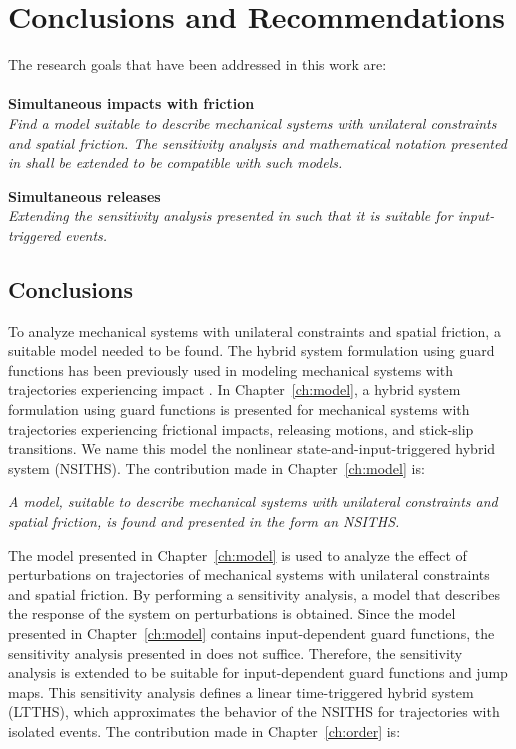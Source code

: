 \documentclass[../DC2017114Bouma.tex]{subfiles}
\begin{document}
\graphicspath{{05_Conclusions/img/}}
\renewcommand{\chaptermark}[1]{\markboth{\thechapter.\ #1}{}}
\renewcommand{\sectionmark}[1]{\markright{#1}{}}
\pagestyle{fancyreport}
\cleartooddpage
\pagestyle{fancyreport}
\chapter{Conclusions and Recommendations}\label{ch:concl}
The research goals that have been addressed in this work are:\\\\
\textbf{Simultaneous impacts with friction}\\
\textit{Find a model suitable to describe mechanical systems with unilateral constraints and spatial friction. The sensitivity analysis and mathematical notation presented in \cite{Rijnen2018a} shall be extended to be compatible with such models.}

\textbf{Simultaneous releases}\\
\textit{Extending the sensitivity analysis presented in \cite{Rijnen2018a} such that it is suitable for input-triggered events.}

\section{Conclusions}
To analyze mechanical systems with unilateral constraints and spatial friction, a suitable model needed to be found. The hybrid system formulation using guard functions has been previously used in modeling mechanical systems with trajectories experiencing impact \cite{Rijnen2018a}. In Chapter~\ref{ch:model}, a hybrid system formulation using guard functions is presented for mechanical systems with trajectories experiencing frictional impacts, releasing motions, and stick-slip transitions. We name this model the nonlinear state-and-input-triggered hybrid system (NSITHS). The contribution made in Chapter~\ref{ch:model} is:

\textit{A model, suitable to describe mechanical systems with unilateral constraints and spatial friction, is found and presented in the form an NSITHS.}

The model presented in Chapter~\ref{ch:model} is used to analyze the effect of perturbations on trajectories of mechanical systems with unilateral constraints and spatial friction. By performing a sensitivity analysis, a model that describes the response of the system on perturbations is obtained. Since the model presented in Chapter~\ref{ch:model} contains input-dependent guard functions, the sensitivity analysis presented in \cite{Rijnen2017} does not suffice. Therefore, the sensitivity analysis is extended to be suitable for input-dependent guard functions and jump maps. This sensitivity analysis defines a linear time-triggered hybrid system (LTTHS), which approximates the behavior of the NSITHS for trajectories with isolated events. The contribution made in Chapter~\ref{ch:order} is:
\end{document}
